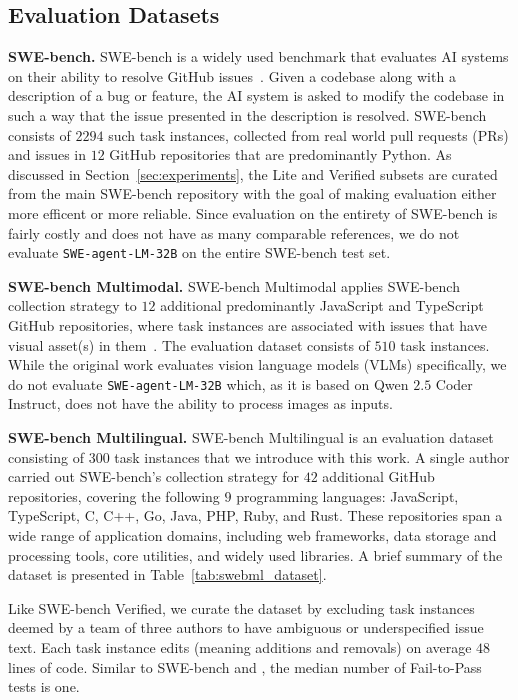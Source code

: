\subsection{Evaluation Datasets}
\label{appx:experiments:eval_datasets}
\textbf{SWE-bench.} SWE-bench is a widely used benchmark that evaluates AI systems on their ability to resolve GitHub issues~\citep{jimenez_swe-bench_2024}.
Given a codebase along with a description of a bug or feature, the AI system is asked to modify the codebase in such a way that the issue presented in the description is resolved.
SWE-bench consists of $2294$ such task instances, collected from real world pull requests (PRs) and issues in $12$ GitHub repositories that are predominantly Python.
As discussed in Section~\ref{sec:experiments}, the Lite and Verified subsets are curated from the main SWE-bench repository with the goal of making evaluation either more efficent or more reliable.
Since evaluation on the entirety of SWE-bench is fairly costly and does not have as many comparable references, we do not evaluate \texttt{SWE-agent-LM-32B} on the entire SWE-bench test set.

\textbf{SWE-bench Multimodal.} SWE-bench Multimodal applies SWE-bench collection strategy to $12$ additional predominantly JavaScript and TypeScript GitHub repositories, where task instances are associated with issues that have visual asset(s) in them~\citep{yang_swe-bench_2024}.
The evaluation dataset consists of $510$ task instances.
While the original work evaluates vision language models (VLMs) specifically, we do not evaluate \texttt{SWE-agent-LM-32B} which, as it is based on Qwen $2.5$ Coder Instruct, does not have the ability to process images as inputs.



\textbf{SWE-bench Multilingual.} SWE-bench Multilingual is an evaluation dataset consisting of 300 task instances that we introduce with this work.
A single author carried out SWE-bench's collection strategy for $42$ additional GitHub repositories, covering the following $9$ programming languages: JavaScript, TypeScript, C, C++, Go, Java, PHP, Ruby, and Rust. These repositories span a wide range of application domains, including web frameworks, data storage and processing tools, core utilities, and widely used libraries. A brief summary of the dataset is presented in Table~\ref{tab:swebml_dataset}.

Like SWE-bench Verified, we curate the dataset by excluding task instances deemed by a team of three authors to have ambiguous or underspecified issue text. 
Each task instance edits (meaning additions and removals) on average $48$ lines of code.
Similar to SWE-bench and \bugs{}, the median number of Fail-to-Pass tests is one.

